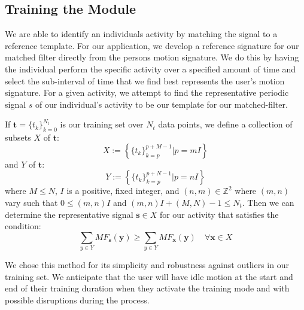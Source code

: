 \documentclass[journal]{IEEEtran}
\begin{document}
\subsection{Training the Module}
We are able to identify an individual\textquotesingle s activity by matching the signal to a reference template.
For our application, we develop a reference signature for our matched filter directly from the person\textquotesingle s motion signature.
We do this by having the individual perform the specific activity over a specified amount of time and select the sub-interval of time that we find best represents the user's motion signature.
For a given activity, we attempt to find the representative periodic signal $s$ of our individual’s activity to be our template for our matched-filter.

If $\textbf{t} = \{t_k\}_{k=0}^{N_t}$ is our training set over $N_t$ data points, we define a collection of subsets $X$ of $\textbf{t}$:
%
\begin{equation} \label{X_subsets_of_training_eq}
X := \left \{ \{t_k\}_{k=p}^{p+M-1} | p=mI \right \}
\end{equation}
%
and $Y$ of $\textbf{t}$:
%
\begin{equation} \label{Y_subsets_of_training_eq}
Y := \left \{ \{t_k\}_{k=p}^{p+N-1} | p=nI \right \}
\end{equation}
%
where $M \leq N$, $I$ is a positive, fixed integer, and $(n,m) \in \mathbb{Z}^2$ where $(m,n)$ vary such that $0 \leq (m,n)I$ and $(m,n)I + (M,N) - 1 \leq N_t$. Then we can determine the representative signal $\textbf{s} \in X$ for our activity that satisfies the condition:
%
\begin{equation} \label{s_condition}
\sum_{y \in Y}MF_{\textbf{s}}(\textbf{y}) \geq \sum_{y \in Y}MF_{\textbf{x}}(\textbf{y}) \quad \forall \textbf{x} \in X
\end{equation}

We chose this method for its simplicity and robustness against outliers in our training set. We anticipate that the user will have idle motion at the start and end of their training duration when they activate the training mode and with possible disruptions during the process.
%
%
\end{document}
